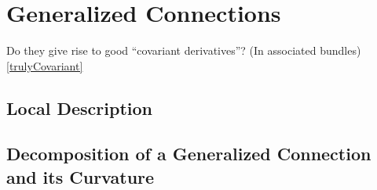 {\section*{Generalized Connections}

Do they give rise to good ``covariant derivatives''? (In associated bundles) \ref{trulyCovariant}



\subsection{Local Description}
\subsection{Decomposition of a Generalized Connection and its Curvature}
}

